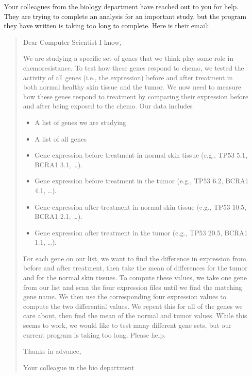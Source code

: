 \documentclass[12pt]{article}
\begin{document}
\renewcommand{\headrulewidth}{0.5pt}

\phantom{Test}

Your colleagues from the biology department have reached out to you for help. They
are trying to complete an analysis for an important study, but the program they
have written is taking too long to complete. Here is their email:


\begin{quote}
Dear Computer Scientist I know,

We are studying a specific set of genes that we think play some role in
chemoresistance. To test how these genes respond to chemo, we tested the
activity of all genes (i.e., the expression) before and after treatment in both
normal healthy skin tissue and the tumor. We now need to measure how these
genes respond to treatment by comparing their expression before and after being
exposed to the chemo. Our data includes
\begin{itemize}
\item A list of genes we are studying
\item A list of all genes
\item Gene expression before treatment in normal skin tissue (e.g., TP53 5.1,
BCRA1 3.1, …).
\item Gene expression before treatment in the tumor (e.g., TP53 6.2, BCRA1 4.1,
…).
\item Gene expression after treatment in normal skin tissue (e.g., TP53 10.5,
BCRA1 2.1, …).
\item Gene expression after treatment in the tumor (e.g., TP53 20.5, BCRA1 1.1,
…).
\end{itemize}

For each gene on our list, we want to find the difference in expression from
before and after treatment, then take the mean of differences for the tumor and
for the normal skin tissues. To compute these values, we take one gene from our
list and scan the four expression files until we find the matching gene name.
We then use the corresponding four expression values to compute the two
differential values. We repeat this for all of the genes we care about, then
find the mean of the normal and tumor values.  While this seems to work,  we
would like to test many different gene sets, but our current program is taking too long. Please help.

Thanks in advance,

Your colleague in the bio department
\end{quote}
\end{document}
